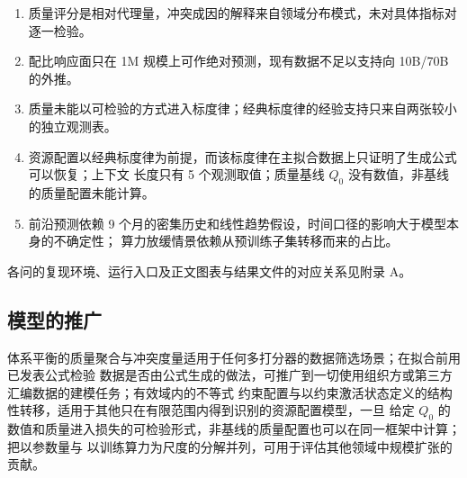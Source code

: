 \begin{enumerate}
  \item 质量评分是相对代理量，冲突成因的解释来自领域分布模式，未对具体指标对逐一检验。
  \item 配比响应面只在 1M 规模上可作绝对预测，现有数据不足以支持向 10B/70B 的外推。
  \item 质量未能以可检验的方式进入标度律；经典标度律的经验支持只来自两张较小的独立观测表。
  \item 资源配置以经典标度律为前提，而该标度律在主拟合数据上只证明了生成公式可以恢复；上下文
        长度只有 5 个观测取值；质量基线 $Q_0$ 没有数值，非基线的质量配置未能计算。
  \item 前沿预测依赖 9 个月的密集历史和线性趋势假设，时间口径的影响大于模型本身的不确定性；
        算力放缓情景依赖从预训练子集转移而来的占比。
\end{enumerate}

\noindent 各问的复现环境、运行入口及正文图表与结果文件的对应关系见附录 A。

\subsection{模型的推广}

体系平衡的质量聚合与冲突度量适用于任何多打分器的数据筛选场景；在拟合前用已发表公式检验
数据是否由公式生成的做法，可推广到一切使用组织方或第三方汇编数据的建模任务；有效域内的不等式
约束配置与以约束激活状态定义的结构性转移，适用于其他只在有限范围内得到识别的资源配置模型，一旦
给定 $Q_0$ 的数值和质量进入损失的可检验形式，非基线的质量配置也可以在同一框架中计算；把以参数量与
以训练算力为尺度的分解并列，可用于评估其他领域中规模扩张的贡献。
